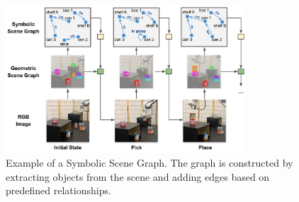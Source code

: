 \begin{figure}[t]
    \centering
    \includegraphics[width=0.8\textwidth]{figures/images/ch4/geometric_scene_graph.jpg}
    \caption{Example of a Symbolic Scene Graph. The graph is constructed by extracting objects from the scene and adding edges based on predefined relationships.}
    \label{fig:geometric_scene_graph}
\end{figure}
